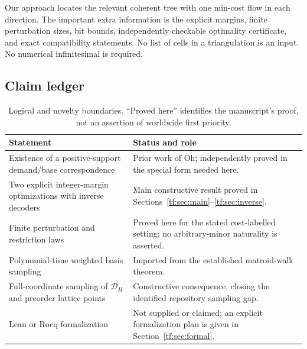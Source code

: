 \documentclass[11pt]{article}
\numberwithin{equation}{section}
\theoremstyle{definition}
\newcommand{\cD}{\mathcal D}
\begin{document}
Our approach locates the relevant coherent tree with one min-cost flow in
each direction. The important extra information is the explicit margins,
finite perturbation sizes, bit bounds, independently checkable optimality
certificate, and exact compatibility statements. No list of cells in a
triangulation is an input. No numerical infinitesimal is required.

\subsection{Claim ledger}
\begin{table}[htbp]\centering\small
\begin{tabularx}{\textwidth}{@{}p{}Y@{}}\toprule
Statement & Status and role\\\midrule
Existence of a positive-support demand/base correspondence & Prior work of
Oh; independently proved in the special form needed here.\\
Two explicit integer-margin optimizations with inverse decoders & Main
constructive result proved in Sections~\ref{tf:sec:main}--\ref{tf:sec:inverse}.\\
Finite perturbation and restriction laws & Proved here for the stated cost-labelled setting;
no arbitrary-minor naturality is asserted.\\
Polynomial-time weighted basis sampling & Imported from the established
matroid-walk theorem.\\
Full-coordinate sampling of $\cD_H$ and preorder lattice points & Constructive
consequence, closing the identified repository sampling gap.\\
Lean or Rocq formalization & Not supplied or claimed; an explicit formalization
plan is given in Section~\ref{tf:sec:formal}.\\\bottomrule
\end{tabularx}
\caption{Logical and novelty boundaries. ``Proved here'' identifies the
manuscript's proof, not an assertion of worldwide first priority.}
\end{table}
\end{document}
